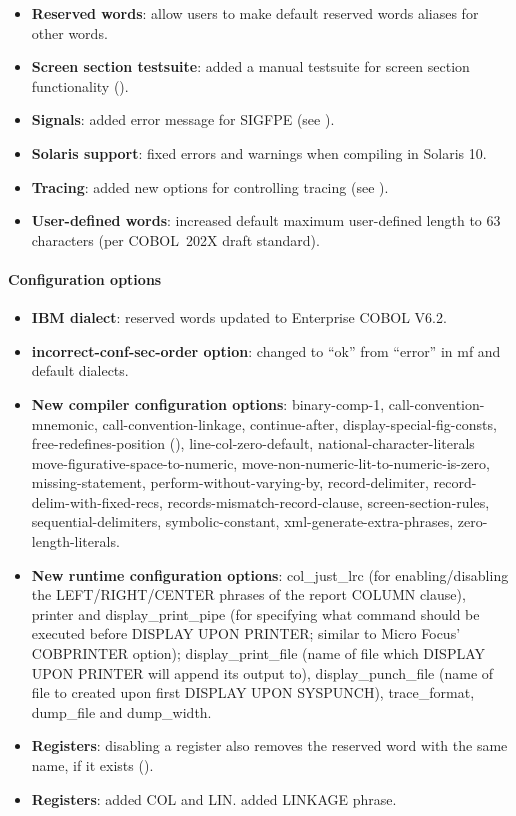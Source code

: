 \begin{itemize}
\item \textbf{Reserved words}: allow users to make default reserved words aliases for other words.
\item  \textbf{Screen section testsuite}: added a manual testsuite for screen section functionality ().
\item \textbf{Signals}: added error message for SIGFPE (see ).
\item \textbf{Solaris support}: fixed errors and warnings when compiling in Solaris 10.
\item \textbf{Tracing}: added new options for controlling tracing (see ).
\item \textbf{User-defined words}: increased default maximum user-defined length to 63 characters (per COBOL~202X draft standard).
\end{itemize}

\paragraph{Configuration options}
\begin{itemize}
\item \textbf{IBM dialect}: reserved words updated to Enterprise COBOL V6.2.
\item \textbf{incorrect-conf-sec-order option}: changed to ``ok'' from ``error'' in mf and default dialects.
\item \textbf{New compiler configuration options}: binary-comp-1, call-convention-mnemonic, call-convention-linkage, continue-after, display-special-fig-consts, free-redefines-position (), line-col-zero-default, national-character-literals move-figurative-space-to-numeric, move-non-numeric-lit-to-numeric-is-zero, missing-statement, perform-without-varying-by, record-delimiter, record-delim-with-fixed-recs, records-mismatch-record-clause, screen-section-rules, sequential-delimiters, symbolic-constant, xml-generate-extra-phrases, zero-length-literals.
\item \textbf{New runtime configuration options}: col\_just\_lrc (for enabling\slash{}disabling the LEFT\slash{}RIGHT\slash{}CENTER phrases of the report COLUMN clause), printer and display\_print\_pipe (for specifying what command should be executed before DISPLAY UPON PRINTER; similar to Micro Focus' COBPRINTER option); display\_print\_file (name of file which DISPLAY UPON PRINTER will append its output to), display\_punch\_file (name of file to created upon first DISPLAY UPON SYSPUNCH), trace\_format, dump\_file and dump\_width.
\item \textbf{Registers}: disabling a register also removes the reserved word with the same name, if it exists ().
\item \textbf{Registers}: added COL and LIN. added LINKAGE phrase.
\end{itemize}

